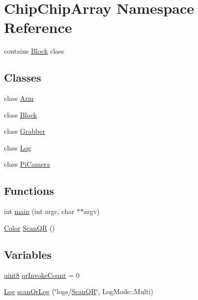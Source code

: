 \hypertarget{namespaceChipChipArray}{\section{Chip\+Chip\+Array Namespace Reference}
\label{namespaceChipChipArray}
}


contains \hyperlink{classChipChipArray_1_1Block}{Block} class  


\subsection*{Classes}
\begin{DoxyCompactItemize}
\item 
class \hyperlink{classChipChipArray_1_1Arm}{Arm}
\item 
class \hyperlink{classChipChipArray_1_1Block}{Block}
\item 
class \hyperlink{classChipChipArray_1_1Grabber}{Grabber}
\item 
class \hyperlink{classChipChipArray_1_1Log}{Log}
\item 
class \hyperlink{classChipChipArray_1_1PiCamera}{Pi\+Camera}
\end{DoxyCompactItemize}
\subsection*{Functions}
\begin{DoxyCompactItemize}
\item 
int \hyperlink{namespaceChipChipArray_a7fc3d1edffca11531cd09fdab7c8b88d}{main} (int argc, char $\ast$$\ast$argv)
\item 
\hyperlink{definitions_8hpp_abc05a0f46084a3477cf5d5c939ff1436}{Color} \hyperlink{namespaceChipChipArray_a6c7465049b5d408e1a238b6d8ffa887d}{Scan\+Q\+R} ()
\end{DoxyCompactItemize}
\subsection*{Variables}
\begin{DoxyCompactItemize}
\item 
\hyperlink{definitions_8hpp_adde6aaee8457bee49c2a92621fe22b79}{uint8} \hyperlink{namespaceChipChipArray_a3b2a3c0ffa9f53021293aeb4955d2fef}{qr\+Invoke\+Count} = 0
\item 
\hyperlink{classChipChipArray_1_1Log}{Log} \hyperlink{namespaceChipChipArray_ab5c6290951637c25a5422707020fb3a8}{scan\+Qr\+Log} (\char`\"{}logs/\hyperlink{namespaceChipChipArray_a6c7465049b5d408e1a238b6d8ffa887d}{Scan\+Q\+R}\char`\"{}, Log\+Mode\+::\+Multi)
\end{DoxyCompactItemize}


